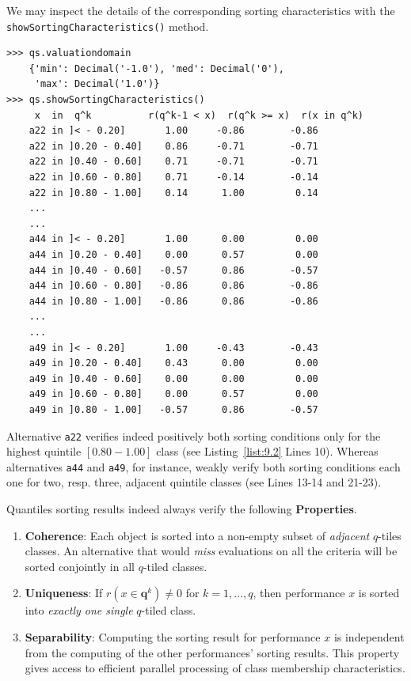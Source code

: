 We may inspect the details of the corresponding sorting characteristics with the \texttt{showSortingCharacteristics()} method.
\begin{lstlisting}[caption={Bipolar-valued sorting characteristics (extract)},label=list:9.2]
>>> qs.valuationdomain
    {'min': Decimal('-1.0'), 'med': Decimal('0'),
     'max': Decimal('1.0')}
>>> qs.showSortingCharacteristics()
     x  in  q^k          r(q^k-1 < x)  r(q^k >= x)  r(x in q^k)
    a22 in ]< - 0.20]	    1.00	 -0.86	      -0.86
    a22 in ]0.20 - 0.40]    0.86	 -0.71	      -0.71
    a22 in ]0.40 - 0.60]    0.71	 -0.71	      -0.71
    a22 in ]0.60 - 0.80]    0.71	 -0.14	      -0.14
    a22 in ]0.80 - 1.00]    0.14	  1.00	       0.14
    ...
    ...
    a44 in ]< - 0.20]	    1.00	  0.00	       0.00
    a44 in ]0.20 - 0.40]    0.00	  0.57	       0.00
    a44 in ]0.40 - 0.60]   -0.57	  0.86	      -0.57
    a44 in ]0.60 - 0.80]   -0.86	  0.86	      -0.86
    a44 in ]0.80 - 1.00]   -0.86	  0.86	      -0.86
    ...
    ...
    a49 in ]< - 0.20]	    1.00	 -0.43	      -0.43
    a49 in ]0.20 - 0.40]    0.43	  0.00	       0.00
    a49 in ]0.40 - 0.60]    0.00	  0.00	       0.00
    a49 in ]0.60 - 0.80]    0.00	  0.57	       0.00
    a49 in ]0.80 - 1.00]   -0.57	  0.86	      -0.57
\end{lstlisting}
Alternative \texttt{a22} verifies indeed positively both sorting conditions only for the highest quintile $[0.80 - 1.00]$ class (see Listing~\ref{list:9.2} Lines 10). Whereas alternatives \texttt{a44} and \texttt{a49}, for instance, weakly verify both sorting conditions each one for two, resp. three, adjacent quintile classes (see Lines 13-14 and 21-23).  

Quantiles sorting results indeed always verify the following \textbf{Properties}.
\begin{enumerate}[leftmargin=0.5cm,rightmargin=0.5cm]
\item \textbf{Coherence}: Each object is sorted into a non-empty subset of \emph{adjacent} $q$-tiles classes. An alternative that would \emph{miss} evaluations on all the criteria will be sorted conjointly in all $q$-tiled classes.
\item \textbf{Uniqueness}: If $r(x \in \mathbf{q}^k) \neq 0$  for $k = 1, ..., q$, then performance $x$ is sorted into \emph{exactly one single} $q$-tiled class.
\item \textbf{Separability}: Computing the sorting result for performance $x$ is independent from the computing of the other performances’ sorting results. This property gives access to efficient parallel processing of class membership characteristics.
\end{enumerate}

